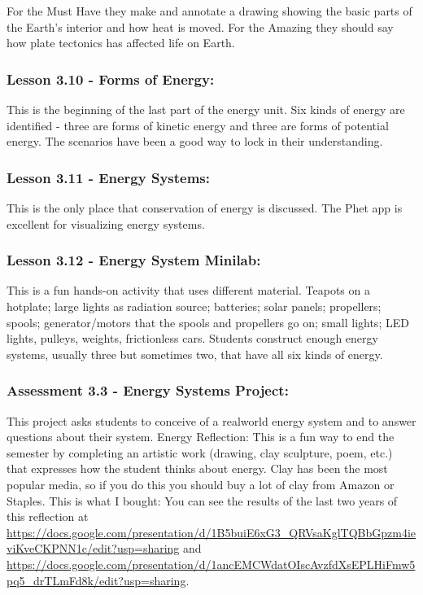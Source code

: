 \documentclass[12pt]{article}
\begin{document}
For the Must Have they make and annotate a drawing showing the basic parts of the Earth’s interior and how heat is moved. For the Amazing they
should say how plate tectonics has affected life on Earth.


\subsubsection{Lesson 3.10 - Forms of Energy:}
\label{sec:orgf87e354}

This is the beginning of the last part of the energy unit. Six kinds of energy are identified - three are forms of kinetic energy and three are forms
of potential energy. The scenarios have been a good way to lock in their understanding.


\subsubsection{Lesson 3.11 - Energy Systems:}
\label{sec:org419e3f4}

This is the only place that conservation of energy is
discussed. The Phet app is excellent for visualizing energy systems.


\subsubsection{Lesson 3.12 - Energy System Minilab:}
\label{sec:orgba4e743}

This is a fun hands-on activity that uses different
material. Teapots on a hotplate; large lights as radiation source; batteries; solar panels;
propellers; spools; generator/motors that the spools and propellers go on; small lights;
LED lights, pulleys, weights, frictionless cars. Students construct enough energy
systems, usually three but sometimes two, that have all six kinds of energy.


\subsubsection{Assessment 3.3 - Energy Systems Project:}
\label{sec:org1bea102}

This project asks students to conceive of a realworld energy system and to answer questions about their system.
Energy Reflection: This is a fun way to end the semester by completing an artistic work
(drawing, clay sculpture, poem, etc.) that expresses how the student thinks about energy. Clay
has been the most popular media, so if you do this you should buy a lot of clay from Amazon or
Staples. This is what I bought:
You can see the results of the last two years of this reflection at
\url{https://docs.google.com/presentation/d/1B5buiE6xG3\_QRVsaKglTQBbGpzm4ieviKveCKPNN1c/edit?usp=sharing} and
\url{https://docs.google.com/presentation/d/1ancEMCWdatOIscAvzfdXsEPLHiFmw5pq5\_drTLmFd8k/edit?usp=sharing}.
\end{document}
